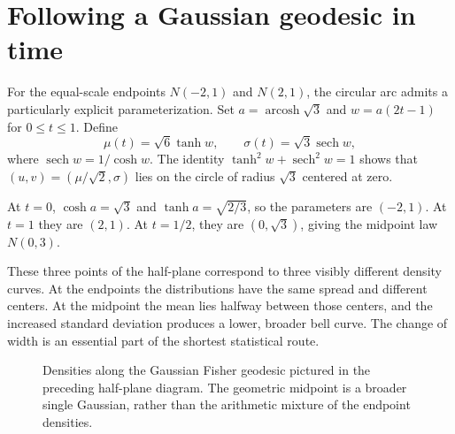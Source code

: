 \documentclass[11pt,oneside,openany]{book}
\theoremstyle{definition}
\theoremstyle{remark}
\newcommand{\arcosh}{\operatorname{arcosh}}
\newcommand{\sech}{\operatorname{sech}}
\numberwithin{equation}{chapter}
\begin{document}
\section{Following a Gaussian geodesic in time}
For the equal-scale endpoints $N(-2,1)$ and $N(2,1)$, the circular arc admits a particularly explicit parameterization. Set $a=\arcosh\sqrt3$ and $w=a(2t-1)$ for $0\leq t\leq1$. Define
\begin{equation}\label{eq:gaussianexplicitpath}
\mu(t)=\sqrt6\tanh w,\qquad
\sigma(t)=\sqrt3\sech w,
\end{equation}
where $\sech w=1/\cosh w$. The identity $\tanh^2w+\sech^2w=1$ shows that $(u,v)=(\mu/\sqrt2,\sigma)$ lies on the circle of radius $\sqrt3$ centered at zero.

At $t=0$, $\cosh a=\sqrt3$ and $\tanh a=\sqrt{2/3}$, so the parameters are $(-2,1)$. At $t=1$ they are $(2,1)$. At $t=1/2$, they are $(0,\sqrt3)$, giving the midpoint law $N(0,3)$.

These three points of the half-plane correspond to three visibly different density curves. At the endpoints the distributions have the same spread and different centers. At the midpoint the mean lies halfway between those centers, and the increased standard deviation produces a lower, broader bell curve. The change of width is an essential part of the shortest statistical route.

\begin{figure}[htbp]
\centering
{}
\caption{Densities along the Gaussian Fisher geodesic pictured in the preceding half-plane diagram. The geometric midpoint is a broader single Gaussian, rather than the arithmetic mixture of the endpoint densities.}
\end{figure}
\end{document}
